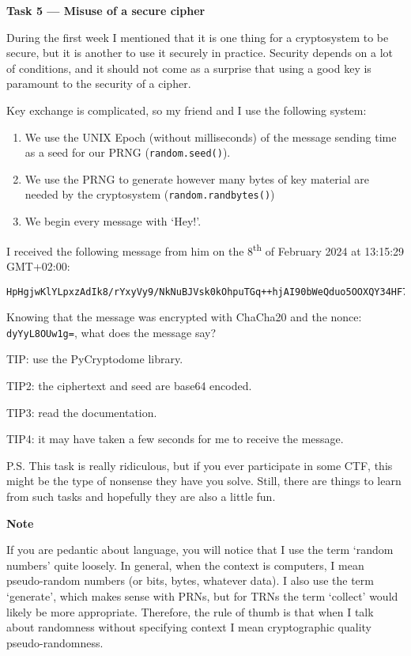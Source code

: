 \documentclass{practice}
\begin{document}
\textbf{Task 5 --- Misuse of a secure cipher}

During the first week I mentioned that it is one thing for a cryptosystem to be secure, but it is another to use it securely in practice.
Security depends on a lot of conditions, and it should not come as a surprise that using a good key is paramount to the security of a cipher.

Key exchange is complicated, so my friend and I use the following system:
\begin{enumerate}
    \item We use the UNIX Epoch (without milliseconds) of the message sending time as a seed for our PRNG (\texttt{random.seed()}).
    \item We use the PRNG to generate however many bytes of key material are needed by the cryptosystem (\texttt{random.randbytes()})
    \item We begin every message with `Hey!'.
\end{enumerate}

I received the following message from him on the 8\textsuperscript{th} of February 2024 at 13:15:29 GMT+02:00:
\begin{lstlisting}
HpHgjwKlYLpxzAdIk8/rYxyVy9/NkNuBJVsk0kOhpuTGq++hjAI90bWeQduo5OOXQY34HF7aOek6GgedJd2npLhhezDO29RF5zzijA==
\end{lstlisting}

Knowing that the message was encrypted with ChaCha20 and the nonce: \texttt{dyYyL8OUw1g=}, what does the message say?

TIP: use the PyCryptodome library.

TIP2: the ciphertext and seed are base64 encoded.

TIP3: read the documentation.

TIP4: it may have taken a few seconds for me to receive the message.

P.S. This task is really ridiculous, but if you ever participate in some CTF, this might be the type of nonsense they have you solve.
Still, there are things to learn from such tasks and hopefully they are also a little fun.

\textbf{Note}

If you are pedantic about language, you will notice that I use the term `random numbers' quite loosely.
In general, when the context is computers, I mean pseudo-random numbers (or bits, bytes, whatever data).
I also use the term `generate', which makes sense with PRNs, but for TRNs the term `collect' would likely be more appropriate.
Therefore, the rule of thumb is that when I talk about randomness without specifying context I mean cryptographic quality pseudo-randomness.
\end{document}
